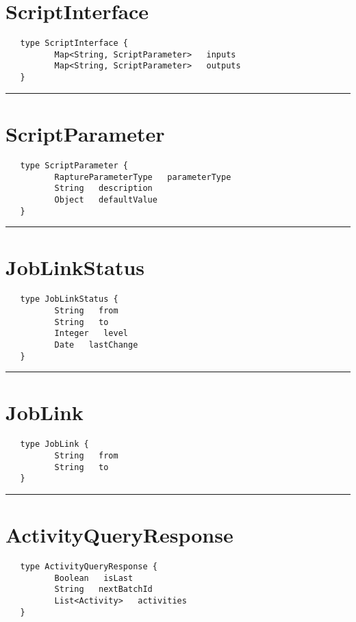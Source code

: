 \section{ScriptInterface}
\label{type:ScriptInterface}

\begin{verbatim}
   type ScriptInterface {
          Map<String, ScriptParameter>   inputs
          Map<String, ScriptParameter>   outputs
   }
\end{verbatim}

\rule{12cm}{2pt}
\section{ScriptParameter}
\label{type:ScriptParameter}

\begin{verbatim}
   type ScriptParameter {
          RaptureParameterType   parameterType
          String   description
          Object   defaultValue
   }
\end{verbatim}

\rule{12cm}{2pt}
\section{JobLinkStatus}
\label{type:JobLinkStatus}

\begin{verbatim}
   type JobLinkStatus {
          String   from
          String   to
          Integer   level
          Date   lastChange
   }
\end{verbatim}

\rule{12cm}{2pt}
\section{JobLink}
\label{type:JobLink}

\begin{verbatim}
   type JobLink {
          String   from
          String   to
   }
\end{verbatim}

\rule{12cm}{2pt}
\section{ActivityQueryResponse}
\label{type:ActivityQueryResponse}

\begin{verbatim}
   type ActivityQueryResponse {
          Boolean   isLast
          String   nextBatchId
          List<Activity>   activities
   }
\end{verbatim}

